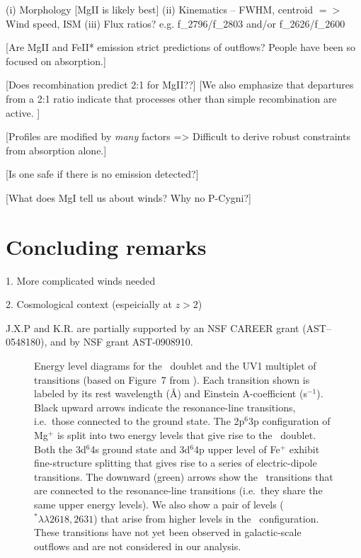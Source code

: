 \documentclass[12pt,preprint]{aastex}
\begin{document}
   (i)  Morphology [MgII is likely best]
  (ii)  Kinematics  --  FWHM, centroid $=>$  Wind speed, ISM
 (iii)  Flux ratios?  e.g.   f\_2796/f\_2803 and/or f\_2626/f\_2600

[Are MgII and FeII* emission strict predictions of outflows?  People
have been so focused on absorption.]

[Does recombination predict 2:1 for MgII??]
[We also emphasize that departures from a 2:1
ratio indicate that processes other than simple recombination are
active. ]

[Profiles are modified by {\it many} factors => Difficult to derive
robust constraints from absorption alone.]

[Is one safe if there is no emission detected?]

[What does MgI tell us about winds?  Why no P-Cygni?]

\section{Concluding remarks}
\label{sec:conclude}

1. More complicated winds needed

2. Cosmological context (espeicially at $z>2$)

\acknowledgments

J.X.P and K.R. are partially supported
by an NSF CAREER grant (AST--0548180), and 
by NSF grant AST-0908910.

\clearpage

%
%



\clearpage








\begin{figure}
\caption{
Energy level diagrams for the \mgiid\ doublet and the UV1
multiplet of  transitions   
(based on Figure~7 from \cite{hmt+99}).
Each transition shown is
labeled by its rest wavelength (\AA) and Einstein A-coefficient
(s$^{-1}$). Black upward arrows
indicate the resonance-line transitions, i.e.\ those connected to the ground
state.  The 2p$^6$3p configuration of Mg$^+$ is split into
two energy levels that give rise to the \mgiid\ doublet.  
Both the 3d$^6$4s ground state and 3d$^6$4p upper level of Fe$^+$
exhibit fine-structure splitting that gives rise to a series of
electric-dipole transitions. 
The downward (green) arrows show the \feiis\ transitions that are connected to the
resonance-line transitions (i.e.\ they share the same upper energy
levels).  We also show a pair of levels ($^* \lambda\lambda
2618,2631$) that arise from higher levels in the \zconfig\
configuration.  These transitions have not yet been observed in
galactic-scale outflows and are not considered in our analysis.
}
\label{fig:energy}
\end{figure}
\end{document}
